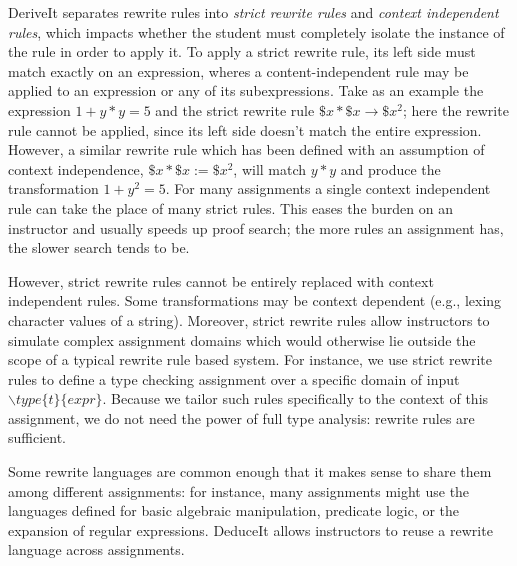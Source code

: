 \documentclass{sigchi}
\newcommand{\msb}[1]{\textbf{\textcolor{cyan}{Michael: #1}}}
\begin{document}
DeriveIt separates rewrite rules into \emph{strict rewrite rules} and \emph{context independent rules}, which impacts whether the student must completely isolate the instance of the rule in order to apply it. To apply a strict rewrite rule, its left side must match exactly on an expression, wheres a content-independent rule may be applied to an expression or any of its subexpressions. Take as an example the expression $1+y*y=5$ and the strict rewrite rule $\$x*\$x \rightarrow \$x^2$; here the rewrite rule cannot be applied, since its left side doesn't match the entire expression. However, a similar rewrite rule which has been defined with an assumption of context independence, $\$x*\$x := \$x^2$, will match $y*y$ and produce the transformation $1+y^2=5$. For many assignments a single context independent rule can take the place of many strict rules. This eases the burden on an instructor and usually speeds up proof search; the more rules an assignment has, the slower search tends to be.

However, strict rewrite rules cannot be entirely replaced with context independent rules. Some transformations may be context dependent (e.g., lexing character values of a string). Moreover, strict rewrite rules allow instructors to simulate complex assignment domains which would otherwise lie outside the scope of a typical rewrite rule based system. For instance, we use strict rewrite rules to define a type checking assignment over a specific domain of input $\backslash{}type\{t\}\{expr\}$. Because we tailor such rules specifically to the context of this assignment, we do not need the power of full type analysis: rewrite rules are sufficient. %


Some rewrite languages are common enough that it makes sense to share them among different assignments: for instance, many assignments might use the languages defined for basic algebraic manipulation, predicate logic, or the expansion of regular expressions. DeduceIt allows instructors to reuse a rewrite language across assignments.
\end{document}
